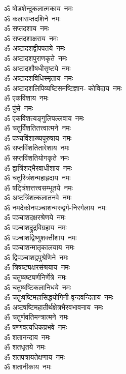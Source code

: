 \begin{multicols}{2}
\begin{flushleft}
ॐ षोडशेन्दुकलात्मकाय~नमः\\
ॐ कलासप्तदशिने~नमः\\
ॐ सप्तदशाय~नमः\\
ॐ सप्तदशाक्षराय~नमः\\
ॐ अष्टादशद्वीपपतये~नमः\\
ॐ अष्टादशपुराणकृते~नमः\hfill{}\\
ॐ अष्टादशौषधीसृष्टये~नमः\\
ॐ अष्टादशविधिस्मृताय~नमः\\
ॐ अष्टादशलिपिव्यष्टिसमष्टिज्ञान- कोविदाय~नमः\\
ॐ एकविंशाय~नमः\\
ॐ पुंसे~नमः\\
ॐ एकविंशत्यङ्गुलिपल्लवाय~नमः\\
ॐ चतुर्विंशतितत्त्वात्मने~नमः\\
ॐ पञ्चविंशाख्यपूरुषाय~नमः\\
ॐ सप्तविंशतितारेशाय~नमः\\
ॐ सप्तविंशतियोगकृते~नमः\hfill{}\\
ॐ द्वात्रिंशद्भैरवाधीशाय~नमः\\
ॐ चतुस्त्रिंशन्महाह्रदाय~नमः\\
ॐ षट्त्रिंशत्तत्त्वसम्भूतये~नमः\\
ॐ अष्टत्रिंशत्कलातनवे~नमः\\
ॐ नमदेकोनपञ्चाशन्मरुद्वर्ग-निरर्गलाय~नमः\\
ॐ पञ्चाशदक्षरश्रेणये~नमः\\
ॐ पञ्चाशद्रुद्रविग्रहाय~नमः\\
ॐ पञ्चाशद्विष्णुशक्तीशाय~नमः\\
ॐ पञ्चाशन्मातृकालयाय~नमः\\
ॐ द्विपञ्चाशद्वपुश्रेणिने~नमः\hfill{}\\
ॐ त्रिषष्ट्यक्षरसंश्रयाय~नमः\\
ॐ चतुष्षष्ट्यर्णनिर्णेत्रे~नमः\\
ॐ चतुष्षष्टिकलानिधये~नमः\\
ॐ चतुःषष्टिमहासिद्धयोगिनी-वृन्दवन्दिताय~नमः\\
ॐ अष्टषष्टिमहातीर्थक्षेत्रभैरव\-भावनाय~नमः\\
ॐ चतुर्णवतिमन्त्रात्मने~नमः\\
ॐ षण्णवत्यधिकप्रभवे~नमः\\
ॐ शतानन्दाय~नमः\\
ॐ शतधृतये~नमः\\
ॐ शतपत्रायतेक्षणाय~नमः\hfill{}\\
ॐ शतानीकाय~नमः\\

\end{flushleft}
\end{multicols}
